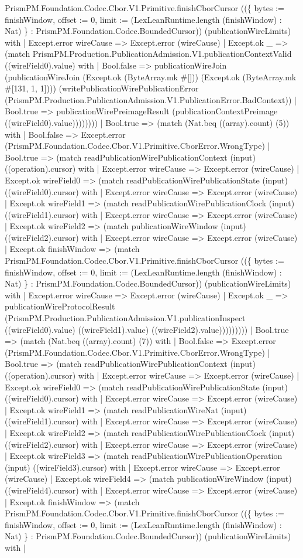 \documentclass[11pt]{article}
\begin{document}
PrismPM.Foundation.Codec.Cbor.V1.Primitive.finishCborCursor ((\{ bytes := finishWindow, offset := 0, limit := (LexLeanRuntime.length (finishWindow) : Nat) \} : PrismPM.Foundation.Codec.BoundedCursor)) (publicationWireLimits) with | Except.error wireCause => Except.error (wireCause) | Except.ok \_ => (match PrismPM.Production.PublicationAdmission.V1.publicationContextValid ((wireField0).value) with | Bool.false => publicationWireJoin (publicationWireJoin (Except.ok (ByteArray.mk \#[])) (Except.ok (ByteArray.mk \#[131, 1, 1]))) (writePublicationWirePublicationError (PrismPM.Production.PublicationAdmission.V1.PublicationError.BadContext)) | Bool.true => publicationWirePreimageResult (publicationContextPreimage ((wireField0).value)))))))) | Bool.true => (match (Nat.beq ((array).count) (5)) with | Bool.false => Except.error (PrismPM.Foundation.Codec.Cbor.V1.Primitive.CborError.WrongType) | Bool.true => (match readPublicationWirePublicationContext (input) ((operation).cursor) with | Except.error wireCause => Except.error (wireCause) | Except.ok wireField0 => (match readPublicationWirePublicationState (input) ((wireField0).cursor) with | Except.error wireCause => Except.error (wireCause) | Except.ok wireField1 => (match readPublicationWirePublicationClock (input) ((wireField1).cursor) with | Except.error wireCause => Except.error (wireCause) | Except.ok wireField2 => (match publicationWireWindow (input) ((wireField2).cursor) with | Except.error wireCause => Except.error (wireCause) | Except.ok finishWindow => (match PrismPM.Foundation.Codec.Cbor.V1.Primitive.finishCborCursor ((\{ bytes := finishWindow, offset := 0, limit := (LexLeanRuntime.length (finishWindow) : Nat) \} : PrismPM.Foundation.Codec.BoundedCursor)) (publicationWireLimits) with | Except.error wireCause => Except.error (wireCause) | Except.ok \_ => publicationWireProtocolResult (PrismPM.Production.PublicationAdmission.V1.publicationInspect ((wireField0).value) ((wireField1).value) ((wireField2).value))))))))) | Bool.true => (match (Nat.beq ((array).count) (7)) with | Bool.false => Except.error (PrismPM.Foundation.Codec.Cbor.V1.Primitive.CborError.WrongType) | Bool.true => (match readPublicationWirePublicationContext (input) ((operation).cursor) with | Except.error wireCause => Except.error (wireCause) | Except.ok wireField0 => (match readPublicationWirePublicationState (input) ((wireField0).cursor) with | Except.error wireCause => Except.error (wireCause) | Except.ok wireField1 => (match readPublicationWireNat (input) ((wireField1).cursor) with | Except.error wireCause => Except.error (wireCause) | Except.ok wireField2 => (match readPublicationWirePublicationClock (input) ((wireField2).cursor) with | Except.error wireCause => Except.error (wireCause) | Except.ok wireField3 => (match readPublicationWirePublicationOperation (input) ((wireField3).cursor) with | Except.error wireCause => Except.error (wireCause) | Except.ok wireField4 => (match publicationWireWindow (input) ((wireField4).cursor) with | Except.error wireCause => Except.error (wireCause) | Except.ok finishWindow => (match PrismPM.Foundation.Codec.Cbor.V1.Primitive.finishCborCursor ((\{ bytes := finishWindow, offset := 0, limit := (LexLeanRuntime.length (finishWindow) : Nat) \} : PrismPM.Foundation.Codec.BoundedCursor)) (publicationWireLimits) with | 
\end{document}
